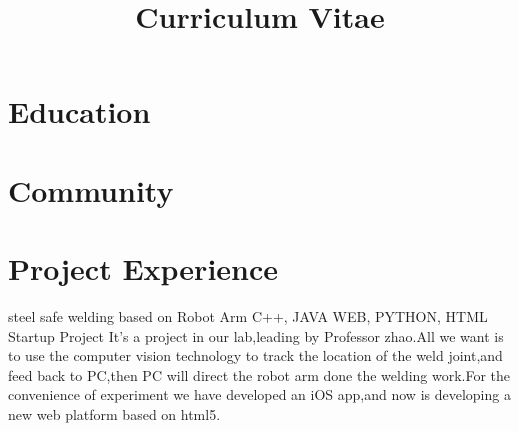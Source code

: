 \documentclass[11pt,a4paper]{moderncv}
\title{Curriculum Vitae}
\begin{document}
\maketitle

\section{Education}



\section{Community}

\section{Project Experience}

{steel safe welding based on Robot Arm}
{C++, JAVA WEB, PYTHON, HTML}
{Startup Project}{}
{It's a project in our lab,leading by Professor zhao.All we want is to use the computer vision technology to track the location of the weld joint,and feed back to PC,then PC will direct the robot arm done the welding work.For the convenience of experiment we have developed an iOS app,and now is developing a new web platform based on html5.}
\end{document}
